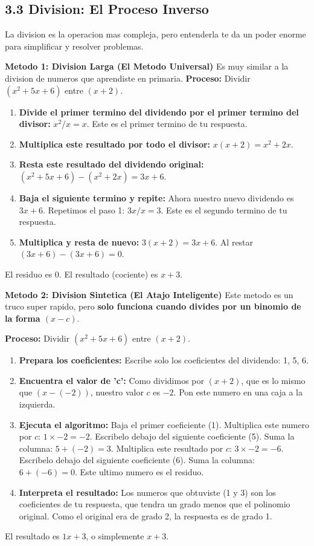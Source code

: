 \documentclass[12pt,a4paper]{article}
\begin{document}
\subsection*{3.3 Division: El Proceso Inverso}
La division es la operacion mas compleja, pero entenderla te da un poder enorme para simplificar y resolver problemas.

\textbf{Metodo 1: Division Larga (El Metodo Universal)}
Es muy similar a la division de numeros que aprendiste en primaria.
\textbf{Proceso:} Dividir $(x^2 + 5x + 6)$ entre $(x + 2)$.
\begin{enumerate}
    \item \textbf{Divide el primer termino del dividendo por el primer termino del divisor:} $x^2 / x = x$. Este es el primer termino de tu respuesta.
    \item \textbf{Multiplica este resultado por todo el divisor:} $x(x+2) = x^2 + 2x$.
    \item \textbf{Resta este resultado del dividendo original:} $(x^2 + 5x + 6) - (x^2 + 2x) = 3x + 6$.
    \item \textbf{Baja el siguiente termino y repite:} Ahora nuestro nuevo dividendo es $3x+6$. Repetimos el paso 1: $3x / x = 3$. Este es el segundo termino de tu respuesta.
    \item \textbf{Multiplica y resta de nuevo:} $3(x+2) = 3x+6$. Al restar $(3x+6) - (3x+6) = 0$.
\end{enumerate}
El residuo es 0. El resultado (cociente) es $x+3$.

\textbf{Metodo 2: Division Sintetica (El Atajo Inteligente)}
Este metodo es un truco super rapido, pero \textbf{solo funciona cuando divides por un binomio de la forma $(x-c)$}.

\textbf{Proceso:} Dividir $(x^2 + 5x + 6)$ entre $(x + 2)$.
\begin{enumerate}
    \item \textbf{Prepara los coeficientes:} Escribe solo los coeficientes del dividendo: 1, 5, 6.
    \item \textbf{Encuentra el valor de 'c':} Como dividimos por $(x+2)$, que es lo mismo que $(x - (-2))$, nuestro valor $c$ es $-2$. Pon este numero en una caja a la izquierda.
    \item \textbf{Ejecuta el algoritmo:}
    Baja el primer coeficiente (1).
    Multiplica este numero por $c$: $1 \times -2 = -2$. Escribelo debajo del siguiente coeficiente (5).
    Suma la columna: $5 + (-2) = 3$.
    Multiplica este resultado por $c$: $3 \times -2 = -6$. Escribelo debajo del siguiente coeficiente (6).
    Suma la columna: $6 + (-6) = 0$. Este ultimo numero es el residuo.
    \item \textbf{Interpreta el resultado:} Los numeros que obtuviste (1 y 3) son los coeficientes de tu respuesta, que tendra un grado menos que el polinomio original. Como el original era de grado 2, la respuesta es de grado 1.
\end{enumerate}
El resultado es $1x + 3$, o simplemente $x+3$.
\end{document}
